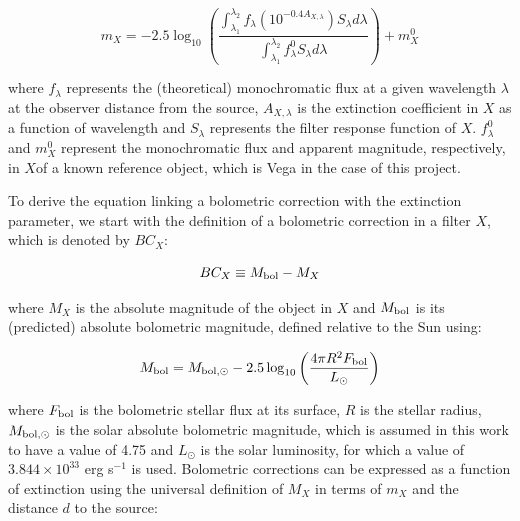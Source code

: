 \documentclass[12pt, a4paper]{report}
\begin{document}
\begin{equation}
m_{X} = -2.5 \log_{10} \left(\frac{ \int_{\lambda_{1}}^{\lambda_{2}} f_{\lambda} \left( 10^{-0.4 A_{X,\lambda}} \right) S_{\lambda} d\lambda }{ \int_{\lambda_{1}}^{\lambda_{2}} f_{\lambda}^{0} S_{\lambda} d\lambda }\right) + m_{X}^{0}
\label{app_mag_def}
\end{equation}

where $f_{\lambda}$ represents the (theoretical) monochromatic flux at a given wavelength $\lambda$ at the observer distance from the source, $A_{X,\lambda}$ is the extinction coefficient in $X$ as a function of wavelength and $S_{\lambda}$ represents the filter response function of $X$. $f_{\lambda}^{0}$ and $m_{X}^{0}$ represent the monochromatic flux and apparent magnitude, respectively, in $X$of a known reference object, which is Vega in the case of this project.


To derive the equation linking a bolometric correction with the extinction parameter, we start with the definition of a bolometric correction in a filter $X$, which is denoted by $BC_{X}$:

\begin{equation}
BC_{X} \equiv M_{\textnormal{bol}} - M_{X}
\label{BC_def}
\end{equation}

where $M_{X}$ is the absolute magnitude of the object in $X$ and $M_{\textnormal{bol}}$ is its (predicted) absolute bolometric magnitude, defined relative to the Sun using:

\begin{equation}
M_{\textnormal{bol}} = M_{\textnormal{bol},\odot} - 2.5 \log_{10} \left( \frac{4\pi R^{2}F_{\textnormal{bol}}}{L_{\odot}} \right)
\label{mbol_sun}
\end{equation}

where  $F_{\textnormal{bol}}$ is the bolometric stellar flux at its surface, $R$ is the stellar radius, $M_{\textnormal{bol},\odot}$ is the solar absolute bolometric magnitude, which is assumed in this work to have a value of 4.75 and $L_{\odot}$ is the solar luminosity, for which a value of $3.844 \times 10^{33}$ erg s$^{-1}$ is used. Bolometric corrections can be expressed as a function of extinction using the universal definition of $M_{X}$ in terms of $m_{X}$ and the distance $d$ to the source:
\end{document}
